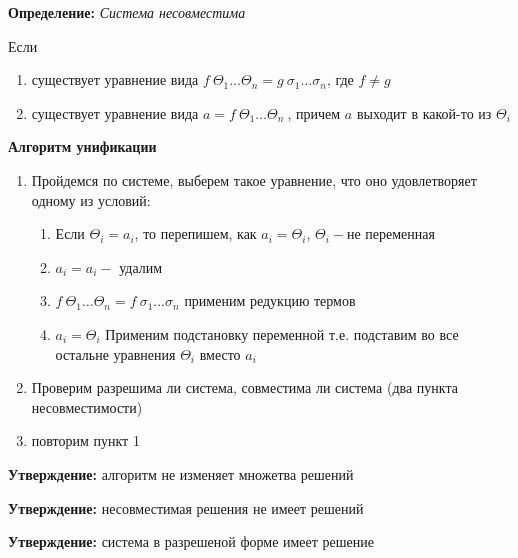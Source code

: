 \documentclass[12pt, a4paper]{article}
\begin{document}
		\textbf{Определение:} \textit{Система несовместима}\par
	Если 
		\begin{enumerate}
			\item существует уравнение вида $f\:\Theta_1\hdots\Theta_n=g\:\sigma_1\hdots\sigma_n$, где $f\neq g$
			\item существует уравнение вида $a=f\: \Theta_1\hdots\Theta_n\:$, причем $a$ выходит в какой-то из $\Theta_i$
		\end{enumerate}			
		\textbf{Алгоритм унификации}\par
		\begin{enumerate}
		\item Пройдемся по системе, выберем такое уравнение, что оно удовлетворяет одному из условий:\begin{enumerate}
			\item Если $\Theta_i=a_i$, то перепишем, как $a_i=\Theta_i$, $\Theta_i-$не переменная
			\item $a_i=a_i-$ удалим
			\item $f\:\Theta_1\hdots\Theta_n=f\:\sigma_1\hdots\sigma_n$  применим редукцию термов 
			\item $a_i=\Theta_i$ Применим подстановку переменной т.е. подставим во все остальне уравнения $\Theta_i$ вместо $a_i$
		\end{enumerate}
		\item Проверим разрешима ли система, совместима ли система (два пункта несовместимости)
		\item повторим пункт 1 		
		\end{enumerate}
		
		\textbf{Утверждение:} алгоритм не изменяет множетва решений\par 
		\textbf{Утверждение:} несовместимая решения не имеет решений\par
		\textbf{Утверждение:} система в разрешеной форме имеет решение\par		
		
\end{document}

